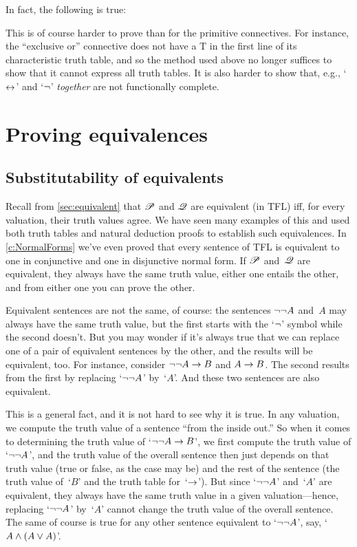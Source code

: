 In fact, the following is true:
        

This is of course harder to prove than for the primitive connectives. For instance, the ``exclusive or'' connective does not have a T in the first line of its characteristic truth table, and so the method used above no longer suffices to show that it cannot express all truth tables.  It is also harder to show that, e.g., `$\leftrightarrow$' and `$\neg$' \emph{together} are not functionally complete.

\chapter{Proving equivalences}\label{ch:equivalences}

\section{Substitutability of equivalents}

Recall from \cref{sec:equivalent} that $\mathscr{P}$ and $\mathscr{Q}$ are equivalent (in TFL) iff, for every valuation, their truth values agree.  We have seen many examples of this and used both truth tables and natural deduction proofs to establish such equivalences.  In \cref{c:NormalForms} we've even proved that every sentence of TFL is equivalent to one in conjunctive and one in disjunctive normal form.  If $\mathscr{P}$ and~$\mathscr{Q}$ are equivalent, they always have the same truth value, either one entails the other, and from either one you can prove the other.

Equivalent sentences are not the same, of course: the sentences $\neg\neg A$ and~$A$ may always have the same truth value, but the first starts with the `$\neg$' symbol while the second doesn't.  But you may wonder if it's always true that we can replace one of a pair of equivalent sentences by the other, and the results will be equivalent, too.  For instance, consider $\neg\neg A \rightarrow B$ and $A \rightarrow B$.  The second results from the first by replacing `$\neg\neg A$' by~`$A$'.  And these two sentences are also equivalent.

This is a general fact, and it is not hard to see why it is true.  In
any valuation, we compute the truth value of a sentence ``from the
inside out.'' So when it comes to determining the truth value of
`$\neg\neg A \rightarrow B$', we first compute the truth value of
`$\neg\neg A$', and the truth value of the overall sentence then
just depends on that truth value (true or false, as the case may be)
and the rest of the sentence (the truth value of~`$B$' and the truth
table for~`$\rightarrow$'). But since `$\neg\neg A$' and~`$A$' are equivalent,
they always have the same truth value in a given valuation---hence,
replacing `$\neg\neg A$' by~`$A$' cannot change the truth value of
the overall sentence.  The same of course is true for any other
sentence equivalent to `$\neg\neg A$', say, `$A \wedge (A \vee A)$'.

